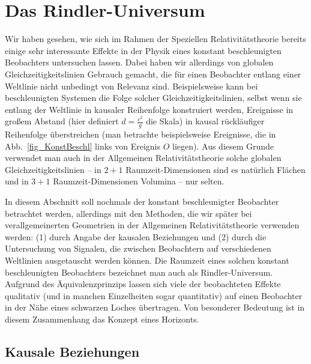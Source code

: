 \section{Das Rindler-Universum}
\label{sec_Rindler}

Wir haben gesehen, wie sich im Rahmen der
Speziellen Relativit\"atstheorie bereits einige
sehr interessante Effekte in der Physik eines konstant 
beschleunigten Beobachters untersuchen lassen. 
Dabei haben wir allerdings von globalen 
Gleichzeitigkeitslinien Gebrauch gemacht,
die f\"ur einen Beobachter entlang einer
Weltlinie nicht unbedingt von Relevanz sind.
Beispielsweise kann bei beschleunigten
Systemen die Folge solcher Gleichzeitigkeitslinien,
selbst wenn sie entlang der Weltlinie in kausaler 
Reihenfolge konstruiert werden, Ereignisse in 
gro\ss em Abstand (hier definiert 
$d=\frac{c^2}{g}$ die Skala) 
in kausal r\"uckl\"aufiger Reihenfolge 
\"uberstreichen (man betrachte beispielsweise
Ereignisse, die in Abb.\ \ref{fig_KonstBeschl}
links von Ereignis $O$ liegen).
Aus diesem Grunde 
verwendet man auch in der Allgemeinen
Relativit\"atstheorie solche globalen
Gleichzeitigkeitslinien -- in $2+1$ Raumzeit-Dimensionen
sind es nat\"urlich Fl\"achen und in $3+1$
Raumzeit-Dimensionen Volumina -- nur 
selten.

In diesem Abschnitt soll nochmals der 
konstant beschleunigter Beobachter betrachtet
werden, allerdings mit den Methoden, die
wir sp\"ater bei verallgemeinerten Geometrien 
in der Allgemeinen Relativit\"atstheorie 
verwenden werden: (1) durch Angabe der 
kausalen Beziehungen und (2) durch 
die Untersuchung von Signalen, die zwischen
Beobachtern auf verschiedenen Weltlinien
ausgetauscht werden k\"onnen.
Die Raumzeit eines solchen konstant 
beschleunigten Beobachters bezeichnet 
man auch als Rindler-Universum.
Aufgrund des \"Aquivalenzprinzips lassen sich
viele der beobachteten Effekte qualitativ (und in manchen 
Einzelheiten sogar quantitativ) auf einen Beobachter 
in der N\"ahe eines schwarzen Loches \"ubertragen. 
Von besonderer Bedeutung ist in diesem Zusammenhang 
das Konzept eines \glqq Horizonts\grqq.

\subsection{Kausale Beziehungen}


